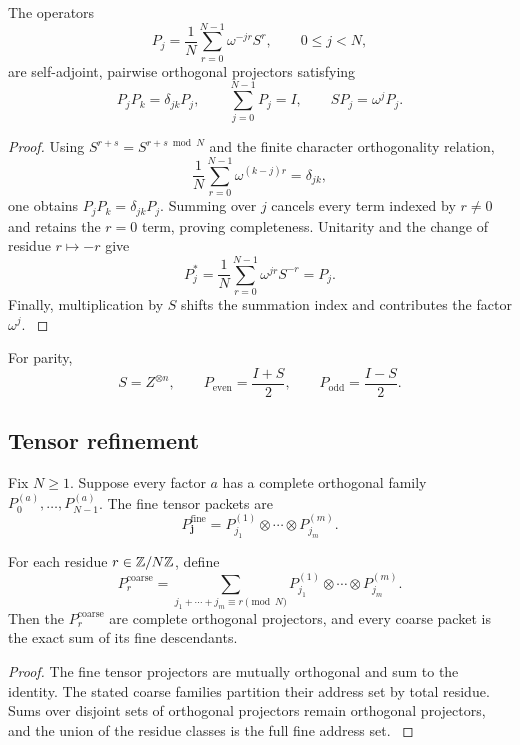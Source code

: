 \begin{theorem}\label{core:theorem:004}\label{core:thm:cyclic}
The operators
\[
\boxed{
P_j
=
\frac1N\sum_{r=0}^{N-1}\omega^{-jr}S^r,
\qquad
0\le j<N,
}
\]
are self-adjoint, pairwise orthogonal projectors satisfying
\[
P_jP_k=\delta_{jk}P_j,
\qquad
\sum_{j=0}^{N-1}P_j=I,
\qquad
SP_j=\omega^jP_j.
\]
\end{theorem}

\begin{proof}\label{core:proof:005}
Using $S^{r+s}=S^{r+s\bmod N}$ and the finite character orthogonality relation,
\[
\frac1N\sum_{r=0}^{N-1}\omega^{(k-j)r}=\delta_{jk},
\]
one obtains $P_jP_k=\delta_{jk}P_j$. Summing over $j$ cancels every term indexed by $r\ne0$ and retains the $r=0$ term, proving completeness. Unitarity and the change of residue $r\mapsto-r$ give
\[
P_j^*=\frac1N\sum_{r=0}^{N-1}\omega^{jr}S^{-r}=P_j.
\]
Finally, multiplication by $S$ shifts the summation index and contributes the factor $\omega^j$.
\label{core:proof:005:end}\end{proof}

For parity,
\[
S=Z^{\otimes n},
\qquad
P_{\mathrm{even}}=\frac{I+S}{2},
\qquad
P_{\mathrm{odd}}=\frac{I-S}{2}.
\]

\subsection{Tensor refinement}

Fix $N\ge1$. Suppose every factor $a$ has a complete orthogonal family $P^{(a)}_0,\ldots,P^{(a)}_{N-1}$. The fine tensor packets are
\[
P_{\mathbf j}^{\mathrm{fine}}
=
P^{(1)}_{j_1}\otimes\cdots\otimes P^{(m)}_{j_m}.
\]

\begin{theorem}\label{core:theorem:005}\label{core:thm:tensor}
For each residue $r\in\bbZ/N\bbZ$, define
\[
\boxed{
P_r^{\mathrm{coarse}}
=
\sum_{j_1+\cdots+j_m\equiv r\pmod N}
P^{(1)}_{j_1}\otimes\cdots\otimes P^{(m)}_{j_m}.
}
\]
Then the $P_r^{\mathrm{coarse}}$ are complete orthogonal projectors, and every coarse packet is the exact sum of its fine descendants.
\end{theorem}

\begin{proof}\label{core:proof:006}
The fine tensor projectors are mutually orthogonal and sum to the identity. The stated coarse families partition their address set by total residue. Sums over disjoint sets of orthogonal projectors remain orthogonal projectors, and the union of the residue classes is the full fine address set.
\label{core:proof:006:end}\end{proof}

